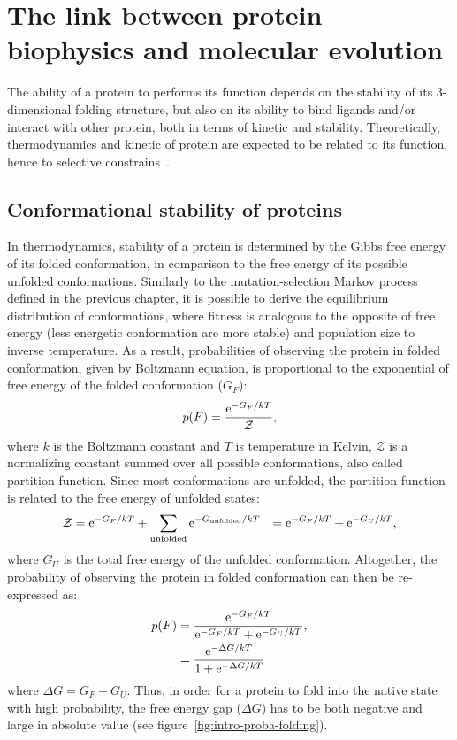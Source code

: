 \section{The link between protein biophysics and molecular evolution}
\label{sec:intro-protein-biophysics}

The ability of a protein to performs its function depends on the stability of its 3-dimensional folding structure, but also on its ability to bind ligands and/or interact with other protein, both in terms of kinetic and stability.
Theoretically, thermodynamics and kinetic of protein are expected to be related to its function, hence to selective constrains~\citep{Bastolla2017}.

\subsection{Conformational stability of proteins}

In thermodynamics, stability of a protein is determined by the Gibbs free energy of its folded conformation, in comparison to the free energy of its possible unfolded conformations.
Similarly to the mutation-selection Markov process defined in the previous chapter, it is possible to derive the equilibrium distribution of conformations, where fitness is analogous to the opposite of free energy (less energetic conformation are more stable) and population size to inverse temperature.
As a result, probabilities of observing the protein in folded conformation, given by Boltzmann equation, is proportional to the exponential of free energy of the folded conformation ($G_F$):
\begin{equation}
p(F) = \frac{\mathrm{e}^{-G_F / kT}}{\mathcal{Z}},
\end{equation}
where $k$ is the Boltzmann constant and $T$ is temperature in Kelvin, $\mathcal{Z}$ is a normalizing constant summed over all possible conformations, also called {partition function}.
Since most conformations are unfolded, the partition function is related to the free energy of unfolded states:
\begin{align}
\mathcal{Z} & = \mathrm{e}^{-G_F / kT} + \sum\limits_{\text{unfolded}} \mathrm{e}^{-G_{\text{unfolded}} / kT}
            & = \mathrm{e}^{-G_F / kT} + \mathrm{e}^{-G_U / kT},
\end{align}
where $G_U$ is the total free energy of the unfolded conformation.
Altogether, the probability of observing the protein in folded conformation can then be re-expressed as:
\begin{align}
p(F) & = \frac{\mathrm{e}^{-G_F / kT}}{\mathrm{e}^{-G_F / kT} + \mathrm{e}^{-G_U / kT}}, \\
     & = \frac{\mathrm{e}^{-\Delta G/kT}}{ 1 + \mathrm{e}^{-\Delta G/kT} }
\end{align}
where $\Delta G = G_F - G_U$.
Thus, in order for a protein to fold into the native state with high probability, the free energy gap ($\Delta G$) has to be both negative and large in absolute value (see figure~\ref{fig:intro-proba-folding}).

